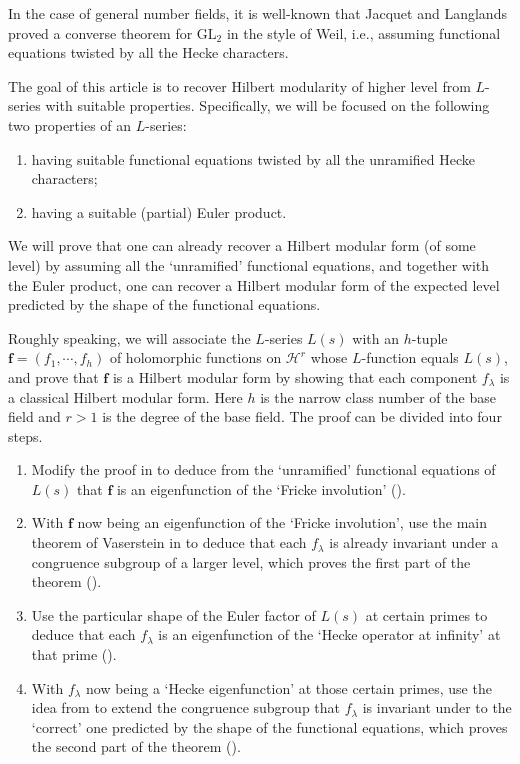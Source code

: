 \documentclass[11pt]{amsart}
\theoremstyle{remark}
\newcommand\mbf[1]{\mathbf{#1}}
\newcommand{\clh}{\mathcal{H}}
\newcommand{\GL}{\mathrm{GL}}
\begin{document}
In the case of general number fields, it is well-known that Jacquet and Langlands \cite{jacquetlanglands} proved a converse theorem for $\GL_2$ in the style of Weil, i.e., assuming functional equations twisted by all the Hecke characters. 

The goal of this article is to recover Hilbert modularity of higher level from $L$-series with suitable properties. Specifically, we will be focused on the following two properties of an $L$-series:
\begin{enumerate}[label=(\arabic*)]
    \item having suitable functional equations twisted by all the unramified Hecke characters;
    \item having a suitable (partial) Euler product.
\end{enumerate}
We will prove that one can already recover a Hilbert modular form (of some level) by assuming all the `unramified' functional equations, and together with the Euler product, one can recover a Hilbert modular form of the expected level predicted by the shape of the functional equations.

Roughly speaking, we will associate the $L$-series $L(s)$ with an $h$-tuple $\mbf{f}=(f_1,\cdots,f_h)$ of holomorphic functions on $\clh^r$ whose $L$-function equals $L(s)$, and prove that $\mbf{f}$ is a Hilbert modular form by showing that each component $f_\lambda$ is a classical Hilbert modular form. Here $h$ is the narrow class number of the base field and $r>1$ is the degree of the base field. The proof can be divided into four steps.
\begin{enumerate}[leftmargin=1.5cm, label=Step \arabic*.]
    \item Modify the proof in \cite[Section~3]{doinaganuma} to deduce from the `unramified' functional equations of $L(s)$ that $\mbf{f}$  is an eigenfunction of the `Fricke involution' ().
    \item With $\mbf{f}$ now being an eigenfunction of the `Fricke involution', use the main theorem of Vaserstein in \cite{vaserstein} to deduce that each $f_\lambda$ is already invariant under a congruence subgroup of a larger level, which proves the first part of the theorem ().
    \item Use the particular shape of the Euler factor of $L(s)$ at certain primes to deduce that each $f_\lambda$ is an eigenfunction of the `Hecke operator at infinity' at that prime ().
    \item With $f_\lambda$ now being a `Hecke eigenfunction' at those certain primes, use the idea from \cite[Theorem~2.2]{conjhecke} to extend the congruence subgroup that $f_\lambda$ is invariant under to the `correct' one predicted by the shape of the functional equations, which proves the second part of the theorem ().
\end{enumerate}
\end{document}
